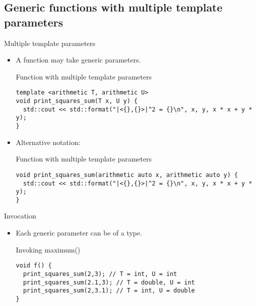\subsection{Generic functions with multiple template parameters}

\begin{frame}[t,fragile]{Multiple template parameters}
\begin{itemize}
  \item A function may take  generic parameters.

\begin{block}{Function with multiple template parameters}
\begin{lstlisting}
template <arithmetic T, arithmetic U>
void print_squares_sum(T x, U y) {
  std::cout << std::format("|<{},{}>|^2 = {}\n", x, y, x * x + y * y);
}
\end{lstlisting}
\end{block}

  \item Alternative notation:

\begin{block}{Function with multiple template parameters}
\begin{lstlisting}
void print_squares_sum(arithmetic auto x, arithmetic auto y) {
  std::cout << std::format("|<{},{}>|^2 = {}\n", x, y, x * x + y * y);
}
\end{lstlisting}
\end{block}

\end{itemize}
\end{frame}

\begin{frame}[t,fragile]{Invocation}
\begin{itemize}
  \item Each generic parameter can be of a  type.

\begin{block}{Invoking maximum()}
\begin{lstlisting}
void f() {
  print_squares_sum(2,3); // T = int, U = int
  print_squares_sum(2.1,3); // T = double, U = int
  print_squares_sum(2,3.1); // T = int, U = double
}
\end{lstlisting}
\end{block}

\end{itemize}
\end{frame}
